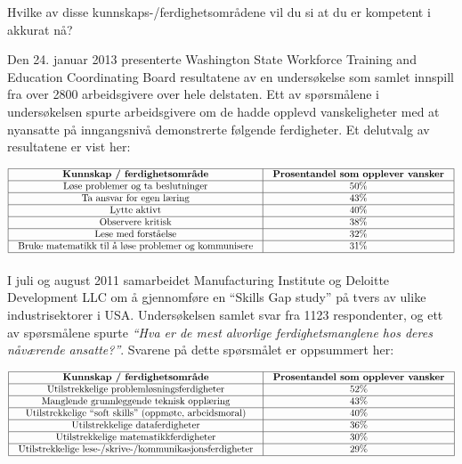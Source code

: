 Hvilke av disse kunnskaps-/ferdighetsområdene vil du si at du er kompetent i akkurat nå?

\vskip 10pt

\filbreak

Den 24. januar 2013 presenterte Washington State Workforce Training and Education Coordinating Board resultatene av en undersøkelse som samlet innspill fra over 2800 arbeidsgivere over hele delstaten.  Ett av spørsmålene i undersøkelsen spurte arbeidsgivere om de hadde opplevd vanskeligheter med at nyansatte på inngangsnivå demonstrerte følgende ferdigheter.  Et delutvalg av resultatene er vist her:


$$\vbox{\offinterlineskip
\halign{\strut
\vrule \quad\hfil # \ \hfil & 
\vrule \quad\hfil # \ \hfil \vrule \cr
\noalign{\hrule}
%
{\bf Kunnskap / ferdighetsområde} & {\bf Prosentandel som opplever vansker} \cr
%
\noalign{\hrule}
%
Løse problemer og ta beslutninger & 50\% \cr
%
\noalign{\hrule}
%
Ta ansvar for egen læring & 43\% \cr
%
\noalign{\hrule}
%
Lytte aktivt & 40\% \cr
%
\noalign{\hrule}
%
Observere kritisk & 38\% \cr
%
\noalign{\hrule}
%
Lese med forståelse & 32\% \cr
%
\noalign{\hrule}
%
Bruke matematikk til å løse problemer og kommunisere & 31\% \cr
%
\noalign{\hrule}
} %
}$$ %

\vskip 10pt

\filbreak

I juli og august 2011 samarbeidet Manufacturing Institute og Deloitte Development LLC om å gjennomføre en ``Skills Gap study'' på tvers av ulike industrisektorer i USA.  Undersøkelsen samlet svar fra 1123 respondenter, og ett av spørsmålene spurte {\it ``Hva er de mest alvorlige ferdighetsmanglene hos deres nåværende ansatte?''}.  Svarene på dette spørsmålet er oppsummert her:


$$\vbox{\offinterlineskip
\halign{\strut
\vrule \quad\hfil # \ \hfil & 
\vrule \quad\hfil # \ \hfil \vrule \cr
\noalign{\hrule}
%
{\bf Kunnskap / ferdighetsområde} & {\bf Prosentandel som opplever vansker} \cr
%
\noalign{\hrule}
%
Utilstrekkelige problemløsningsferdigheter & 52\% \cr
%
\noalign{\hrule}
%
Manglende grunnleggende teknisk opplæring & 43\% \cr
%
\noalign{\hrule}
%
Utilstrekkelige ``soft skills'' (oppmøte, arbeidsmoral) & 40\% \cr
%
\noalign{\hrule}
%
Utilstrekkelige dataferdigheter & 36\% \cr
%
\noalign{\hrule}
%
Utilstrekkelige matematikkferdigheter & 30\% \cr
%
\noalign{\hrule}
%
Utilstrekkelige lese-/skrive-/kommunikasjonsferdigheter & 29\% \cr
%
\noalign{\hrule}
} %
}$$ %

